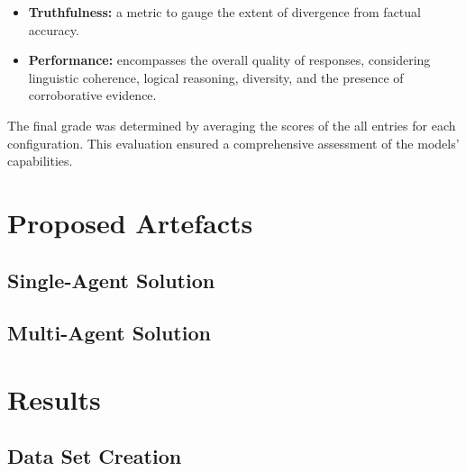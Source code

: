             \begin{itemize}
                
                \item \textbf{Truthfulness:} a metric to gauge the extent of divergence from factual accuracy.
        
                \item  \textbf{Performance:} encompasses the overall quality of responses, considering linguistic coherence, logical reasoning, diversity, and the presence of corroborative evidence.
                
            \end{itemize}
            
            The final grade was determined by averaging the scores of the all entries for each configuration. This evaluation ensured a comprehensive assessment of the models' capabilities.





\section{Proposed Artefacts}
\subsection{Single-Agent Solution}
\subsection{Multi-Agent Solution}

            
    \section{Results}


\subsection{Data Set Creation}


